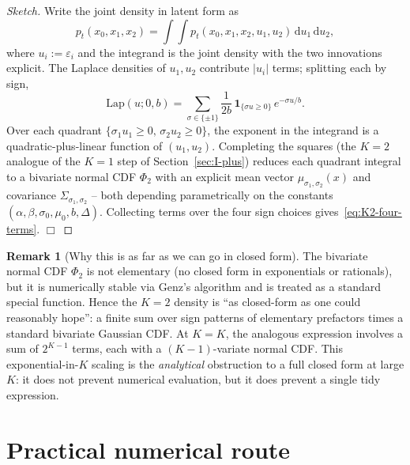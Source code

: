 \documentclass[11pt,a4paper,openany]{book}
\theoremstyle{plainserif}
\theoremstyle{definition}
\theoremstyle{remarkstyle}
\newtheorem*{remark}{Remark}
\newcommand{\Lap}{\mathrm{Lap}}
\begin{document}
\begin{proof}[Sketch]
Write the joint density in latent form as
\begin{equation}
p_t(x_0,x_1,x_2) = \int\!\!\int p_t(x_0,x_1,x_2, u_1, u_2)\,
                          \mathrm{d}u_1\,\mathrm{d}u_2,
\end{equation}
where $u_i := \varepsilon_i$ and the integrand is the joint density with
the two innovations explicit. The Laplace densities of $u_1, u_2$
contribute $|u_i|$ terms; splitting each by sign,
\begin{equation}
\Lap(u; 0, b) = \sum_{\sigma\in\{\pm 1\}}
  \frac{1}{2b}\,\mathbf{1}_{\{\sigma u \geq 0\}}\,e^{-\sigma u/b}.
\end{equation}
Over each quadrant $\{\sigma_1 u_1 \geq 0,\, \sigma_2 u_2 \geq 0\}$, the
exponent in the integrand is a quadratic-plus-linear function of
$(u_1, u_2)$. Completing the squares (the $K=2$ analogue of the $K=1$
step of Section~\ref{sec:I-plus}) reduces each quadrant integral to a
bivariate normal CDF $\Phi_2$ with an explicit mean vector
$\mu_{\sigma_1, \sigma_2}(x)$ and covariance $\Sigma_{\sigma_1, \sigma_2}$
-- both depending parametrically on the constants $(\alpha, \beta, \sigma_0,
\mu_0, b, \Delta)$. Collecting terms over the four sign choices
gives~\eqref{eq:K2-four-terms}. $\Box$
\end{proof}

\begin{remark}[Why this is as far as we can go in closed form]
The bivariate normal CDF $\Phi_2$ is not elementary (no closed form in
exponentials or rationals), but it is numerically stable via Genz's
algorithm and is treated as a standard special function. Hence the
$K=2$ density is ``as closed-form as one could reasonably hope'': a
finite sum over sign patterns of elementary prefactors times a standard
bivariate Gaussian CDF. At $K=K$, the analogous expression involves a
sum of $2^{K-1}$ terms, each with a $(K-1)$-variate normal CDF. This
exponential-in-$K$ scaling is the \emph{analytical} obstruction to a
full closed form at large $K$: it does not prevent numerical evaluation,
but it does prevent a single tidy expression.
\end{remark}

\section{Practical numerical route}
\end{document}
